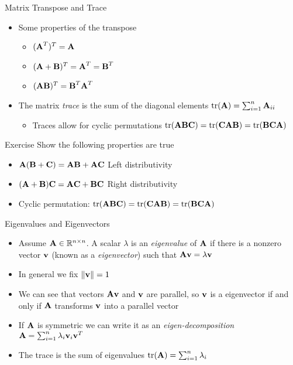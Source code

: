 \documentclass{beamer}
\begin{document}
\begin{frame}{Matrix Transpose and Trace} 
 \begin{itemize} 
  \item Some properties of the transpose  
  \begin{itemize}
  \item $(\textbf{A}^T)^T = \textbf{A}$ 
  \item $(\textbf{A} + \textbf{B})^T = \textbf{A}^T = \textbf{B}^T$ 
  \item $(\textbf{A}\textbf{B})^T = \textbf{B}^T\textbf{A}^T$  
  \end{itemize} 
 \item The matrix \emph{trace} is the sum of the diagonal elements $\mbox{tr}(\textbf{A}) = \sum_{i=1}^n \textbf{A}_{ii}$ 
 \begin{itemize} 
 \item Traces allow for cyclic permutations $\mbox{tr}(\textbf{A}\textbf{B}\textbf{C}) = \mbox{tr}(\textbf{C}\textbf{A}\textbf{B}) = \mbox{tr}(\textbf{B}\textbf{C}\textbf{A})$ 
 \end{itemize}
 \end{itemize}
\end{frame}

\begin{frame}{Exercise} 
Show the following properties are true
\begin{itemize}
 \item $\textbf{A}(\textbf{B} + \textbf{C}) = \textbf{A}\textbf{B} + \textbf{A}\textbf{C}$ Left distributivity 
 \item $(\textbf{A} +\textbf{B}) \textbf{C} = \textbf{A}\textbf{C} +\textbf{B}\textbf{C}$ Right distributivity 
 \item Cyclic permutation: $\mbox{tr}(\textbf{A}\textbf{B}\textbf{C}) = \mbox{tr}(\textbf{C}\textbf{A}\textbf{B}) = \mbox{tr}(\textbf{B}\textbf{C}\textbf{A})$ 
\end{itemize}
\end{frame}

\begin{frame}{Eigenvalues and Eigenvectors}  
\begin{itemize} 
 \item Assume $\textbf{A} \in \mathbb{R}^{n \times n}$. A scalar $\lambda$ is an \emph{eigenvalue} of $\textbf{A}$ if there is a nonzero vector $\textbf{v}$ (known as a \emph{eigenvector}) such that $\textbf{A}\textbf{v} = \lambda\textbf{v}$
 \item In general we fix $\|\textbf{v}\| = 1$ 
 \item We can see that vectors $\textbf{A}\textbf{v}$ and $\textbf{v}$ are parallel, so $\textbf{v}$ is a eigenvector if and only if $\textbf{A}$ transforms $\textbf{v}$ into a parallel vector  
 \item If $\textbf{A}$ is symmetric we can write it as an \emph{eigen-decomposition} $\textbf{A} = \sum_{i=1}^n \lambda_i\textbf{v}_i\textbf{v}^T$ 
 \item The trace is the sum of eigenvalues $\mbox{tr}(\textbf{A}) = \sum_{i=1}^n \lambda_i$
\end{itemize}
\end{frame}
\end{document}
